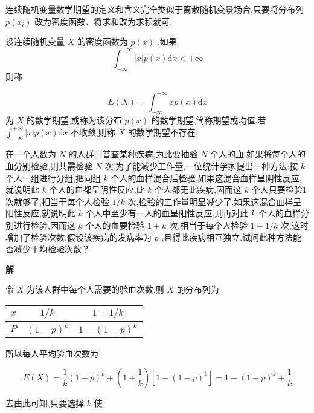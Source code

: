 连续随机变量数学期望的定义和含义完全类似于离散随机变景场合,只要将分布列 $ p(x_i) $ 改为密度函数、将求和改为求积就可.

\begin{definition}{}{}
	设连续随机变量 $ X $ 的密度函数为 $ p(x) $ .如果
	\[ 
	\int_{-\infty}^{+\infty}|x| p(x) \mathrm{d} x<+\infty
	\]
	则称
	
	\begin{equation} 
	E(X)=\int_{-\infty}^{+\infty} x p(x) \mathrm{d} x \label{eq:2.2.2}
	\end{equation}
	为 $ X $ 的数学期望,或称为该分布 $ p(x) $ 的数学期望,简称期望或均值.若 $ \int_{-\infty}^{+\infty}|x| p(x) \mathrm{d} x $ 不收敛,则称 $ X $ 的数学期望不存在.
	
\end{definition}

\begin{example}
	在一个人数为 $ N $ 的人群中普查某种疾病,为此要抽验 $ N $ 个人的血.如果将每个人的血分别检验,则共需检验 $ N $ 次.为了能减少工作量,一位统计学家提出一种方法:按 $ k $ 个人一组进行分组,把同组 $ k $ 个人的血样混合后检验,如果这混合血样呈阴性反应,就说明此 $ k $ 个人的血都呈阴性反应,此 $ k $ 个人都无此疾病,因而这 $ k $ 个人只要检验1次就够了,相当于每个人检验 $ 1/k $ 次,检验的工作量明显减少了.如果这混合血样呈阳性反应,就说明此 $ k $ 个人中至少有一人的血呈阳性反应,则再对此 $ k $ 个人的血样分别进行检验,因而这 $ k $ 个人的血要检验 $ 1+k $ 次,相当于每个人检验 $ 1+1/k $ 次,这时增加了检验次数.假设该疾病的发病率为 $ p $ ,且得此疾病相互独立.试问此种方法能否减少平均检验次数？
	
	\textbf{解}
	
	令 $ X $ 为该人群中每个人需要的验血次数,则 $ X $ 的分布列为
	
	\begin{table}[htbp]
		\centering
		\begin{tabular}{c|cc}
			 $ x $ 	& $ 1 / k $ & $ 1+1 / k $ \\\midrule
			 $ P $ 	& $ (1-p)^{k} $ & $ 1-(1-p)^{k} $ \\
		\end{tabular}%
	\end{table}%
	
\end{example}

所以每人平均验血次数为

\[ 
E(X)=\frac{1}{k}(1-p)^{k}+\left(1+\frac{1}{k}\right)\left[1-(1-p)^{k}\right]=1-(1-p)^{k}+\frac{1}{k}
\]

去由此可知,只要选择 $ k $ 使

